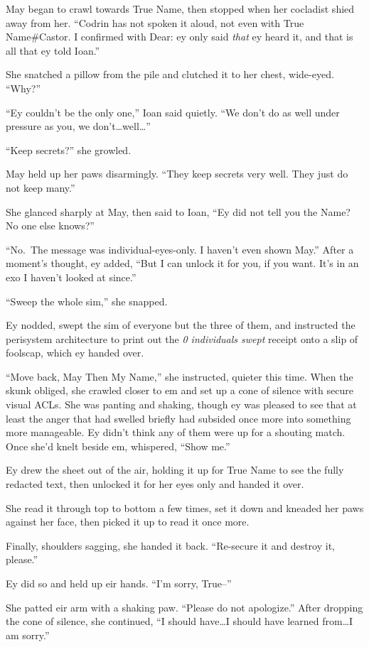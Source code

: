 May began to crawl towards True Name, then stopped when her cocladist shied away from her. ``Codrin has not spoken it aloud, not even with True Name\#Castor. I confirmed with Dear: ey only said \emph{that} ey heard it, and that is all that ey told Ioan.''

She snatched a pillow from the pile and clutched it to her chest, wide-eyed. ``Why?''

``Ey couldn't be the only one,'' Ioan said quietly. ``We don't do as well under pressure as you, we don't\ldots well\ldots{}''

``Keep secrets?'' she growled.

May held up her paws disarmingly. ``They keep secrets very well. They just do not keep many.''

She glanced sharply at May, then said to Ioan, ``Ey did not tell you the Name? No one else knows?''

``No.~The message was individual-eyes-only. I haven't even shown May.'' After a moment's thought, ey added, ``But I can unlock it for you, if you want. It's in an exo I haven't looked at since.''

``Sweep the whole sim,'' she snapped.

Ey nodded, swept the sim of everyone but the three of them, and instructed the perisystem architecture to print out the \emph{0 individuals swept} receipt onto a slip of foolscap, which ey handed over.

``Move back, May Then My Name,'' she instructed, quieter this time. When the skunk obliged, she crawled closer to em and set up a cone of silence with secure visual ACLs. She was panting and shaking, though ey was pleased to see that at least the anger that had swelled briefly had subsided once more into something more manageable. Ey didn't think any of them were up for a shouting match. Once she'd knelt beside em, whispered, ``Show me.''

Ey drew the sheet out of the air, holding it up for True Name to see the fully redacted text, then unlocked it for her eyes only and handed it over.

She read it through top to bottom a few times, set it down and kneaded her paws against her face, then picked it up to read it once more.

Finally, shoulders sagging, she handed it back. ``Re-secure it and destroy it, please.''

Ey did so and held up eir hands. ``I'm sorry, True--''

She patted eir arm with a shaking paw. ``Please do not apologize.'' After dropping the cone of silence, she continued, ``I should have\ldots I should have learned from\ldots I am sorry.''


